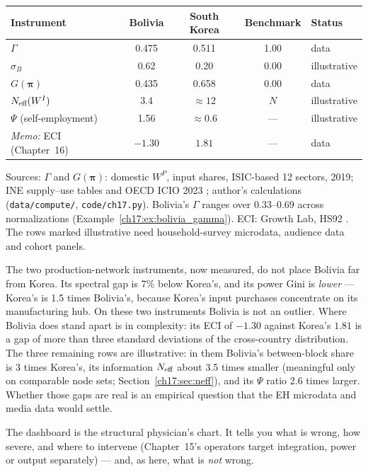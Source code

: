 \documentclass[../structural_economics_book.tex]{subfiles}
\begin{document}
\begin{example}\label{ch17:ex:dashboard}
\begin{center}
\begin{tabular}{lcccl}
\toprule
\textbf{Instrument} & \textbf{Bolivia} & \textbf{South Korea} & \textbf{Benchmark} & \textbf{Status} \\
\midrule
$\Gamma$ & 0.475 & 0.511 & 1.00 & data \\
$\sigma_B$ & 0.62 & 0.20 & 0.00 & illustrative \\
$G(\boldsymbol{\pi})$ & 0.435 & 0.658 & 0.00 & data \\
$N_{\text{eff}}(W^I)$ & 3.4 & $\approx 12$ & $N$ & illustrative \\
$\Psi$ (self-employment) & 1.56 & $\approx 0.6$ & --- & illustrative \\
\midrule
\textit{Memo:} ECI (Chapter~16) & $-1.30$ & $1.81$ & --- & data \\
\bottomrule
\end{tabular}
\par\footnotesize Sources: $\Gamma$ and $G(\boldsymbol{\pi})$: domestic $W^P$, input shares, ISIC-based 12 sectors, 2019; INE supply--use tables \citep{ine2026sut} and OECD ICIO 2023 \citep{oecd2023icio}; author's calculations (\texttt{data/compute/}, \texttt{code/ch17.py}). Bolivia's $\Gamma$ ranges over $0.33$--$0.69$ across normalizations (Example~\ref{ch17:ex:bolivia_gamma}). ECI: Growth Lab, HS92 \citep{growthlab2026atlas}. The rows marked illustrative need household-survey microdata, audience data and cohort panels.
\end{center}

The two production-network instruments, now measured, do not place Bolivia far from Korea. Its spectral gap is 7\% below Korea's, and its power Gini is \emph{lower} --- Korea's is 1.5 times Bolivia's, because Korea's input purchases concentrate on its manufacturing hub. On these two instruments Bolivia is not an outlier. Where Bolivia does stand apart is in complexity: its ECI of $-1.30$ against Korea's $1.81$ is a gap of more than three standard deviations of the cross-country distribution. The three remaining rows are illustrative: in them Bolivia's between-block share is 3 times Korea's, its information $N_{\text{eff}}$ about 3.5 times smaller (meaningful only on comparable node sets; Section~\ref{ch17:sec:neff}), and its $\Psi$ ratio 2.6 times larger. Whether those gaps are real is an empirical question that the EH microdata and media data would settle.

The dashboard is the structural physician's chart. It tells you what is wrong, how severe, and where to intervene (Chapter~15's operators target integration, power or output separately) --- and, as here, what is \emph{not} wrong.
\end{example}
\end{document}
